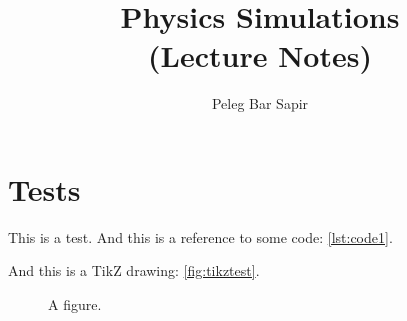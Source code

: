\documentclass[a4paper, twoside, symmetric, nobib, nohyper]{tufte-book}
\title{Physics Simulations\\(Lecture Notes)}
\author{Peleg Bar Sapir}
\begin{document}
\maketitle

\ifdefined\testcode
  \chapter{Tests}
  This is a test. And this is a reference to some code: \autoref{lst:code1}.
  

  And this is a TikZ drawing: \autoref{fig:tikztest}.

  \begin{figure}
      \begin{center}
      \end{center}
    \caption{A figure.}\label{fig:tikztest}
  \end{figure}
  
\else
\fi

\makeatletter
{}

% 
% 
% 
% 
\makeatother
\end{document}
